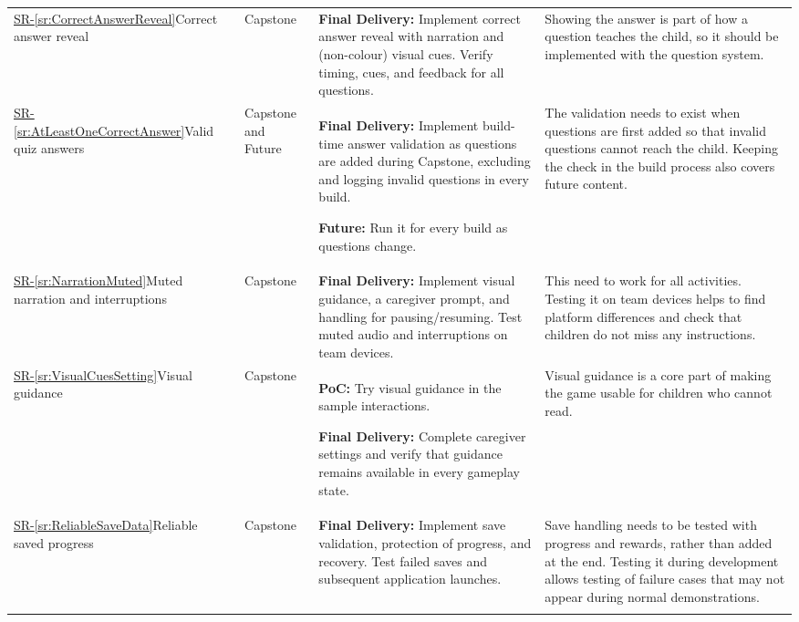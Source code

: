\documentclass{article}
\newcounter{sr}
\newcommand{\srref}[1]{\hyperref[sr:#1]{SR-\ref*{sr:#1}}}
\begin{document}
\begin{longtable}{@{}L{0.20\textwidth}L{0.16\textwidth}L{0.27\textwidth}L{\tabcolsep\relax}@{}}
\srref{CorrectAnswerReveal}\newline Correct answer reveal
& Capstone
& \textbf{Final Delivery:} Implement correct answer
  reveal with narration and (non-colour) visual cues. Verify timing, cues, and feedback for all questions.
& Showing the answer is part of how a question teaches the child, so it should be
  implemented with the question system.\\
\addlinespace

\srref{AtLeastOneCorrectAnswer}\newline Valid quiz answers
& Capstone and Future
& \textbf{Final Delivery:} Implement build-time answer validation as questions
  are added during Capstone, excluding and logging invalid questions in every build.

  \textbf{Future:} Run it for every build as questions change.
& The validation needs to exist when questions are first added so that invalid
  questions cannot reach the child. Keeping the check in the build process also
  covers future content.\\
\addlinespace

\srref{NarrationMuted}\newline Muted narration and interruptions
& Capstone
& \textbf{Final Delivery:} Implement visual guidance, a caregiver prompt,
  and handling for pausing/resuming. Test muted audio and interruptions on team devices.
& This need to work for all activities. Testing it on team devices helps to find platform differences and
  check that children do not miss any instructions.\\
\addlinespace

\srref{VisualCuesSetting}\newline Visual guidance
& Capstone
& \textbf{PoC:} Try visual guidance in the sample interactions.

  \textbf{Final Delivery:} Complete caregiver settings and verify that guidance
  remains available in every gameplay state.
& Visual guidance is a core part of making the game usable for children who cannot read.\\
\addlinespace

\srref{ReliableSaveData}\newline Reliable saved progress
& Capstone
& \textbf{Final Delivery:} Implement save validation, protection of progress, and recovery. Test failed saves
and subsequent application launches.
& Save handling needs to be tested with progress and rewards, rather than added
  at the end. Testing it during development allows testing of failure cases that may
  not appear during normal demonstrations.\\
\addlinespace


\end{longtable}
\end{document}
